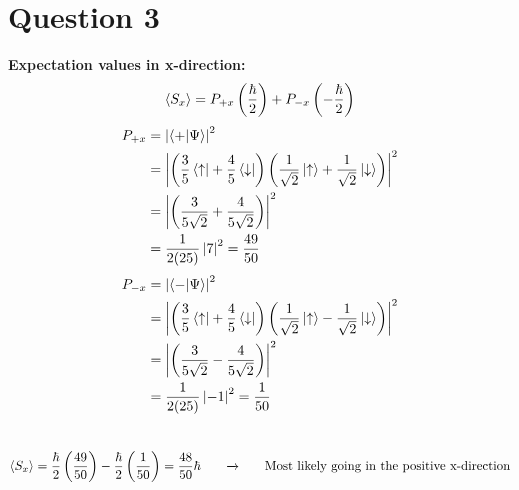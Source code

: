 \documentclass[12pt]{article}
\begin{document}
\newpage

\section*{Question 3}

\textbf{Expectation values in x-direction:} \\

\[
 \braket{S_x} = P_{+x}\left(\frac{\hbar}{2}\right) + P_{-x}\left(-\frac{\hbar}{2}\right)
\]
\begin{equation}
    \begin{split}
        P_{+x} &= \left|\braket{+|\Psi}\right|^2 \\
        &= \left|\left(\frac{3}{5}\bra{\uparrow} + \frac{4}{5}\bra{\downarrow}\right)\left(\frac{1}{\sqrt{2}}\ket{\uparrow} + \frac{1}{\sqrt{2}}\ket{\downarrow}\right)\right|^2 \\
        &= \left|\left( \frac{3}{5\sqrt{2}} + \frac{4}{5\sqrt{2}}\right)\right|^2 \\
        &= \frac{1}{2(25)}\left| 7 \right|^2 = \frac{49}{50} \\
    \end{split}
\end{equation}
\begin{equation}
    \begin{split}
        P_{-x} &= \left|\braket{-|\Psi}\right|^2 \\
        &= \left|\left(\frac{3}{5}\bra{\uparrow} + \frac{4}{5}\bra{\downarrow}\right)\left(\frac{1}{\sqrt{2}}\ket{\uparrow} - \frac{1}{\sqrt{2}}\ket{\downarrow}\right)\right|^2 \\
        &= \left|\left( \frac{3}{5\sqrt{2}} - \frac{4}{5\sqrt{2}}\right)\right|^2 \\
        &= \frac{1}{2(25)}\left|-1\right|^2 = \frac{1}{50} \\
    \end{split}
\end{equation}\\ 
\begin{equation}
    \begin{split}
        \braket{S_x} &= \frac{\hbar}{2}\left(\frac{49}{50}\right) - \frac{\hbar}{2}\left(\frac{1}{50}\right) = \frac{48}{50}\hbar \text{\qquad \rightarrowfill \qquad Most likely going in the positive x-direction}\\\\
    \end{split}
\end{equation}
\end{document}
